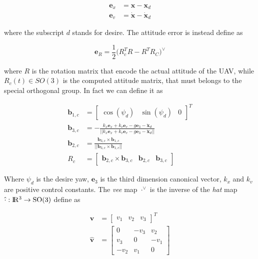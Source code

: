 \begin{align}
	\mathbf{e}_x &= \mathbf{x} - \mathbf{x}_d \\ 
	\mathbf{e}_v &= \dot{\mathbf{x}} - \dot{\mathbf{x}}_d
\end{align}

\noindent where the subscript $d$ stands for desire. The attitude error is instead define as

\begin{equation}
	\mathbf{e}_R = \frac{1}{2}\bigl(R_c^TR-R^TR_C \bigl)^{\vee}
\end{equation}

\noindent where $R$ is the rotation matrix that encode the actual attitude of the UAV, while $R_c(t) \in SO(3)$ is the computed attitude matrix, that must belongs to the special orthogonal group. In fact we can define it as

\begin{align}
	\mathbf{b}_{1,c} &= \begin{bmatrix} \cos(\psi_d) & \sin(\psi_d) & 0 \end{bmatrix}^T \\
	\mathbf{b}_{3,c} &= -\frac{k_x\mathbf{e}_x+k_v\mathbf{e}_v-g\mathbf{e}_3-\ddot{\mathbf{x}}_d}{||k_x\mathbf{e}_x+k_v\mathbf{e}_v-g\mathbf{e}_3-\ddot{\mathbf{x}}_d||} \\
	\mathbf{b}_{2,c} &= \frac{\mathbf{b}_{3,c}\times\mathbf{b}_{1,c}}{||\mathbf{b}_{3,c}\times\mathbf{b}_{1,c}||} \\
	R_c &= \left[\begin{array}{c|c|c}\mathbf{b}_{2,c}\times\mathbf{b}_{3,c} & \mathbf{b}_{2,c} & \mathbf{b}_{3,c} \end{array}\right]
\end{align}

\noindent Where $\psi_d$ is the desire yaw, $\mathbf{e}_3$ is the third dimension canonical vector, $k_x$ and $k_v$ are positive control constants. The \textit{vee} map $\cdot^{\vee}$ is the inverse of the \textit{hat} map $\hat{\cdot}: \rm I\!R^3 \rightarrow SO(3)$ define as

\begin{align}
	\mathbf{v} &= \begin{bmatrix} v_1 & v_2 & v_3 \end{bmatrix}^T \nonumber \\ 
	\hat{\mathbf{v}} &= 
	\begin{bmatrix}
		0    & -v_3 & v_2 \\
		v_3  & 0    & -v_1 \\
		-v_2 & v_1  & 0
	\end{bmatrix}
\end{align}

